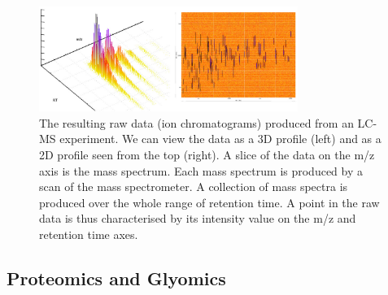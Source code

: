 \begin{figure}[htb!]
\noindent \begin{centering}
\includegraphics[width=0.75\textwidth]{02-background/figures/report_0001}
\par\end{centering}
\caption{\label{fig:LC-MS-data}The resulting raw data (ion chromatograms) produced from an LC-MS experiment. We can view the data as a 3D profile (left) and as a 2D profile seen from the top (right). A slice of the data on the m/z axis is the mass spectrum. Each mass spectrum is produced by a scan of the mass spectrometer. A collection of mass spectra is produced over the whole range of retention time. A point in the raw data is thus characterised by its intensity value on the m/z and retention time axes.}
\end{figure}

\subsection{Proteomics and Glyomics}

